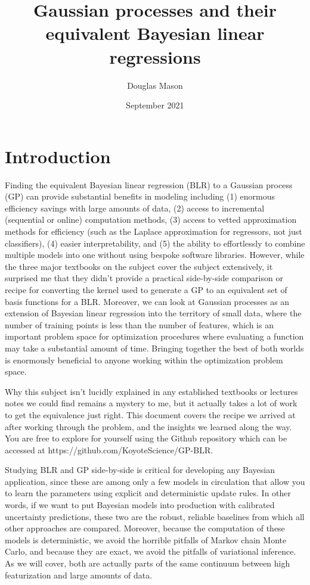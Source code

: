 \documentclass{article}
\title{Gaussian processes and their equivalent Bayesian linear regressions}
\author[1]{Douglas Mason}
\affil[1]{Koyote Science, LLC \footnote{\href{http://www.koyotescience.com}{\texttt{http://www.koyotescience.com}}}}
\date{September 2021}
\begin{document}
\maketitle

\section{Introduction}

Finding the equivalent Bayesian linear regression (BLR) to a Gaussian process (GP) can provide substantial benefits in modeling including (1) enormous efficiency savings with large amounts of data, (2) access to incremental (sequential or online) computation methods, (3) access to vetted approximation methods for efficiency (such as the Laplace approximation for regressors, not just classifiers), (4) easier interpretability, and (5) the ability to effortlessly to combine multiple models into one without using bespoke software libraries. However, while the three major textbooks on the subject \cite{bishop, murphy, rasmussen} cover the subject extensively, it surprised me that they didn't provide a practical side-by-side comparison or recipe for converting the kernel used to generate a GP to an equivalent set of basis functions for a BLR. Moreover, we can look at Gaussian processes as an extension of Bayesian linear regression into the territory of small data, where the number of training points is less than the number of features, which is an important problem space for optimization procedures where evaluating a function may take a substantial amount of time. Bringing together the best of both worlds is enormously beneficial to anyone working within the optimization problem space.

Why this subject isn't lucidly explained in any established textbooks or lectures notes we could find remains a mystery to me, but it actually takes a lot of work to get the equivalence just right. This document covers the recipe we arrived at after working through the problem, and the insights we learned along the way. You are free to explore for yourself using the  Github repository which can be accessed at https://github.com/KoyoteScience/GP-BLR.

Studying BLR and GP side-by-side is critical for developing any Bayesian application, since these are among only a few models in  circulation that allow you to learn the parameters using explicit and deterministic update rules. In other words, if we want to put Bayesian models into production with calibrated uncertainty predictions, these two are the robust, reliable baselines from which all other approaches are compared. Moreover, because the computation of these models is deterministic, we avoid the horrible pitfalls of Markov chain Monte Carlo, and because they are exact, we avoid the pitfalls of variational inference. As we will cover, both are actually parts of the same continuum between high featurization and large amounts of data. 
\end{document}
